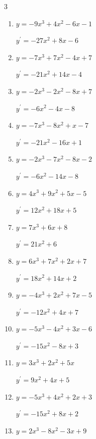 \begin{multicols}{3}
\begin{enumerate}
        $\displaystyle y^{\prime}=-6x^{2}+18x-1$

  \item $y=-9x^{3}+4x^{2}-6x-1$

        $\displaystyle y^{\prime}=-27x^{2}+8x-6$

\columnbreak %

  \item $y=-7x^{3}+7x^{2}-4x+7$

        $\displaystyle y^{\prime}=-21x^{2}+14x-4$

  \item $y=-2x^{3}-2x^{2}-8x+7$

        $\displaystyle y^{\prime}=-6x^{2}-4x-8$

  \item $y=-7x^{3}-8x^{2}+x-7$

        $\displaystyle y^{\prime}=-21x^{2}-16x+1$

  \item $y=-2x^{3}-7x^{2}-8x-2$

        $\displaystyle y^{\prime}=-6x^{2}-14x-8$

  \item $y=4x^{3}+9x^{2}+5x-5$

        $\displaystyle y^{\prime}=12x^{2}+18x+5$

  \item $y=7x^{3}+6x+8$

        $\displaystyle y^{\prime}=21x^{2}+6$

  \item $y=6x^{3}+7x^{2}+2x+7$

        $\displaystyle y^{\prime}=18x^{2}+14x+2$

  \item $y=-4x^{3}+2x^{2}+7x-5$

        $\displaystyle y^{\prime}=-12x^{2}+4x+7$

  \item $y=-5x^{3}-4x^{2}+3x-6$

        $\displaystyle y^{\prime}=-15x^{2}-8x+3$

  \item $y=3x^{3}+2x^{2}+5x$

        $\displaystyle y^{\prime}=9x^{2}+4x+5$

  \item $y=-5x^{3}+4x^{2}+2x+3$

        $\displaystyle y^{\prime}=-15x^{2}+8x+2$

  \item $y=2x^{3}-8x^{2}-3x+9$


\end{enumerate}
\end{multicols}
